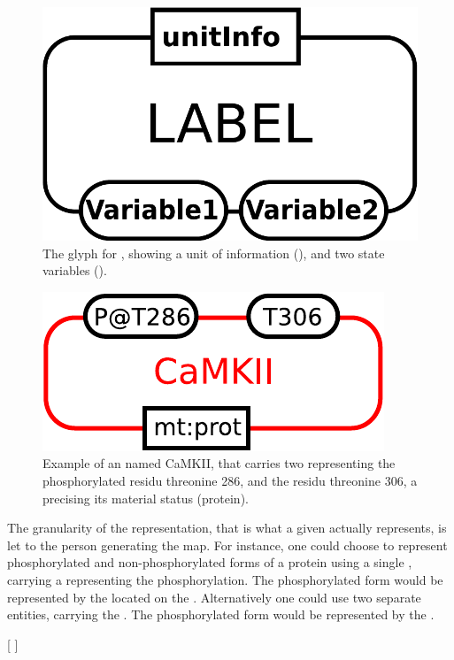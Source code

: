 \begin{figure}[H]
  \centering
  \includegraphics[scale = 0.3]{images/entity}
  \caption{The \ER glyph for , showing a unit of information (), and two state variables ().}
  \label{fig:entity}
\end{figure}

\begin{figure}[H]
  \centering
  \includegraphics[scale = 0.5]{examples/ex-entity}
  \caption{Example of an  named CaMKII, that carries two  representing the phosphorylated residu threonine 286, and the residu threonine 306, a  precising its material status (protein).}
  \label{fig:ex-entity}
\end{figure}

The granularity of the representation, that is what a given  actually represents, is let to the person generating the map. For instance, one could choose to represent phosphorylated and non-phosphorylated forms of a protein using a single , carrying a  representing the phosphorylation. The phosphorylated form would be represented by the  located on the . Alternatively one could use two separate entities, carrying the  . The phosphorylated form would be represented by the .

[ 	]

